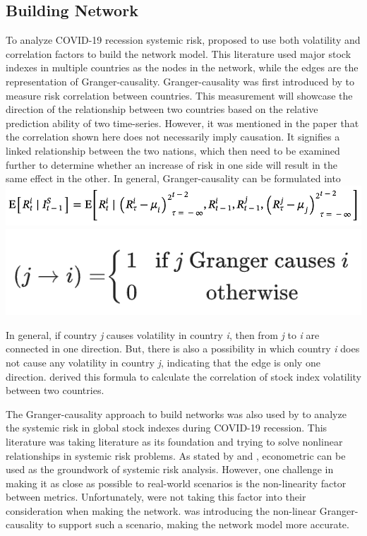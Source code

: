 \documentclass[a4paper,11pt]{article}
\begin{document}
\subsection{Building Network}
To analyze COVID-19 recession systemic risk, \cite{Lai_Hu_2021} proposed to use both volatility and correlation factors to build the network model. This literature used major stock indexes in multiple countries as the nodes in the network, while the edges are the representation of Granger-causality. Granger-causality was first introduced by \cite{Billio_Getmansky_Lo_Pelizzon_2012} to measure risk correlation between countries. This measurement will showcase the direction of the relationship between two countries based on the relative prediction ability of two time-series. However, it was mentioned in the paper that the correlation shown here does not necessarily imply causation. It signifies a linked relationship between the two nations, which then need to be examined further to determine whether an increase of risk in one side will result in the same effect in the other. In general, Granger-causality can be formulated into
\includegraphics[scale=0.5]{granger_causality_1.png}
\includegraphics[scale=0.5]{granger_causality_2.png}

In general, if country \textit{j} causes volatility in country \textit{i}, then from \textit{j} to \textit{i} are connected in one direction. But, there is also a possibility in which country \textit{i} does not cause any volatility in country \textit{j}, indicating that the edge is only one direction. \cite{Lai_Hu_2021} derived this formula to calculate the correlation of stock index volatility between two countries.

The Granger-causality approach to build networks was also used by \cite{Zhang_Yin_Sha_2023} to analyze the systemic risk in global stock indexes during COVID-19 recession. This literature was taking \cite{Lai_Hu_2021} literature as its foundation and trying to solve nonlinear relationships in systemic risk problems. As stated by \cite{Chen_Cummins_Viswanathan_Weiss_2013} and \cite{Etesami_Habibnia_Kiyavash_2017}, econometric can be used as the groundwork of systemic risk analysis. However, one challenge in making it as close as possible to real-world scenarios is the non-linearity factor between metrics. Unfortunately, \cite{Lai_Hu_2021} were not taking this factor into their consideration when making the network. \cite{Zhang_Yin_Sha_2023} was introducing the non-linear Granger-causality to support such a scenario, making the network model more accurate. 
\end{document}
